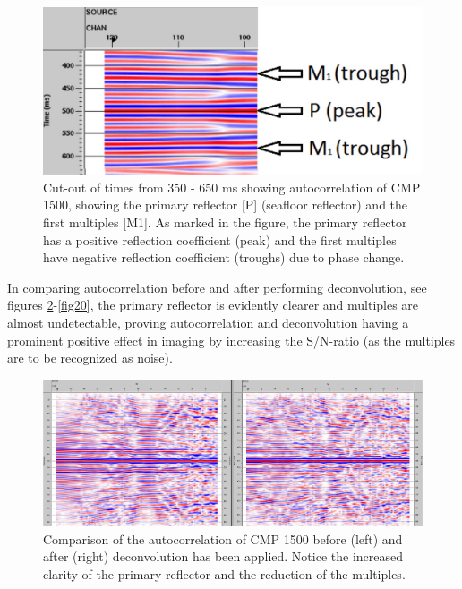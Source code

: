 \documentclass[10pt,a4paper]{article}
\begin{document}
\begin{figure}[H]
\centering
\includegraphics[scale=0.3]{fig17.jpg}
\caption{Cut-out of times from 350 - 650 ms showing autocorrelation of CMP 1500, showing the primary reflector [P] (seafloor reflector) and the first multiples [M1]. As marked in the figure, the primary reflector has a positive reflection coefficient (peak) and the first multiples have negative reflection coefficient (troughs) due to phase change.}
\label{fig17}
\end{figure}

\noindent In comparing autocorrelation before and after performing deconvolution, see figures \ref{fig18}-\ref{fig20}, the primary reflector is evidently clearer and multiples are almost undetectable, proving autocorrelation and deconvolution having a prominent positive effect in imaging by increasing the S/N-ratio (as the multiples are to be recognized as noise).

\begin{figure}[H]
\includegraphics[width=\textwidth]{fig18.jpg}
\caption{Comparison of the autocorrelation of CMP 1500 before (left) and after (right) deconvolution has been applied. Notice the increased clarity of the primary reflector and the reduction of the multiples.}
\label{fig18}
\end{figure}
\end{document}
